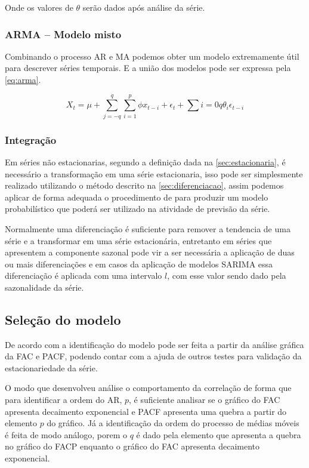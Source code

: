 \documentclass[
    12pt,
    oneside,
    a4paper,
    english,
    brazil
]{abntex2}
\begin{document}
Onde os valores de $\theta$ serão dados após análise da série.

\subsubsection{ARMA -- Modelo misto}

Combinando o processo AR e MA podemos obter um modelo extremamente útil para
descrever séries temporais. E a união dos modelos pode ser expressa pela
\autoref{eq:arma}.

\begin{equation}
    \label{eq:arma}
    X_t = \mu + \sum_{j=-q}^{q}\sum_{i = 1}^{p} \phi{}x_{t-i}+\epsilon_t+\sum{i = 0}{q}\theta_i\epsilon_{t-i}
\end{equation}

\subsubsection{Integração}

Em séries não estacionarias, segundo a definição dada na
\autoref{sec:estacionaria}, é necessário a transformação em uma série
estacionaria, isso pode ser simplesmente realizado utilizando o método descrito
na \autoref{sec:diferenciacao}, assim podemos aplicar de forma adequada o
procedimento de  para produzir um modelo probabilístico que
poderá ser utilizado na atividade de previsão da série.

Normalmente uma diferenciação é suficiente para remover a tendencia de uma
série e a transformar em uma série estacionária, entretanto em séries que
apresentem a componente sazonal pode vir a ser necessária a aplicação de duas
ou mais diferenciações e em casos da aplicação de modelos SARIMA essa
diferenciação é aplicada com uma intervalo $l$, com esse valor sendo dado pela
sazonalidade da série.

\subsection{Seleção do modelo}

De acordo com  a identificação do modelo pode ser feita
a partir da análise gráfica da FAC e PACF, podendo contar com a ajuda de outros
testes para validação da estacionariedade da série.

O modo que  desenvolveu análise o comportamento da correlação
de forma que para identificar a ordem do AR, $p$, é suficiente analisar se o
gráfico do FAC apresenta decaimento exponencial e PACF apresenta uma quebra a
partir do elemento $p$ do gráfico. Já a identificação da ordem do processo de
médias móveis é feita de modo análogo, porem o $q$ é dado pela elemento que
apresenta a quebra no gráfico do FACP enquanto o gráfico do FAC apresenta
decaimento exponencial.
\end{document}
